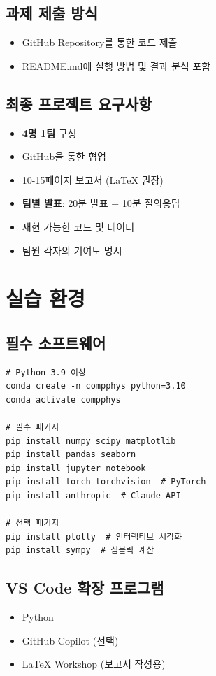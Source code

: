 \documentclass[11pt,a4paper]{article}
\begin{document}
\subsection{과제 제출 방식}
\begin{itemize}[noitemsep]
    \item GitHub Repository를 통한 코드 제출
    \item README.md에 실행 방법 및 결과 분석 포함
\end{itemize}

\subsection{최종 프로젝트 요구사항}
\begin{itemize}[noitemsep]
    \item \textbf{4명 1팀} 구성
    \item GitHub을 통한 협업
    \item 10-15페이지 보고서 (LaTeX 권장)
    \item \textbf{팀별 발표}: 20분 발표 + 10분 질의응답
    \item 재현 가능한 코드 및 데이터
    \item 팀원 각자의 기여도 명시
\end{itemize}

\section{실습 환경}

\subsection{필수 소프트웨어}
\begin{verbatim}
# Python 3.9 이상
conda create -n compphys python=3.10
conda activate compphys

# 필수 패키지
pip install numpy scipy matplotlib
pip install pandas seaborn
pip install jupyter notebook
pip install torch torchvision  # PyTorch
pip install anthropic  # Claude API

# 선택 패키지
pip install plotly  # 인터랙티브 시각화
pip install sympy  # 심볼릭 계산
\end{verbatim}

\subsection{VS Code 확장 프로그램}
\begin{itemize}[noitemsep]
    \item Python
    \item GitHub Copilot (선택)
    \item LaTeX Workshop (보고서 작성용)
\end{itemize}
\end{document}
